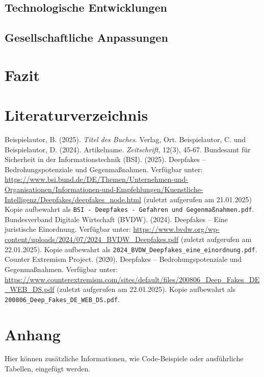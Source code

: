 \documentclass[a4paper,12pt]{article}
\begin{document}
\subsection{Technologische Entwicklungen}
\subsection{Gesellschaftliche Anpassungen}
\newpage

\section{Fazit}



\newpage
{}
\section*{Literaturverzeichnis}
\begin{thebibliography}{99}
     Beispielautor, B. (2025). 
    \textit{Titel des Buches}. Verlag, Ort.
     Beispielautor, C. und Beispielautor, D. (2024). Artikelname. 
    \textit{Zeitschrift}, 12(3), 45-67.
     Bundesamt für Sicherheit in der Informationstechnik (BSI). (2025). Deepfakes – Bedrohungspotenziale und Gegenmaßnahmen. 
    Verfügbar unter: \url{https://www.bsi.bund.de/DE/Themen/Unternehmen-und-Organisationen/Informationen-und-Empfehlungen/Kuenstliche-Intelligenz/Deepfakes/deepfakes_node.html} (zuletzt aufgerufen am 21.01.2025) Kopie aufbewahrt als \texttt{BSI - Deepfakes - Gefahren und Gegenmaßnahmen.pdf}.
     Bundesverband Digitale Wirtschaft (BVDW). (2024). Deepfakes – Eine juristische Einordnung. 
    Verfügbar unter: \url{https://www.bvdw.org/wp-content/uploads/2024/07/2024_BVDW_Deepfakes.pdf} (zuletzt aufgerufen am 22.01.2025). Kopie aufbewahrt als \texttt{2024\_BVDW\_Deepfakes\_eine\_einordnung.pdf}.
     Counter Extremism Project. (2020). Deepfakes – Bedrohungspotenziale und Gegenmaßnahmen.
    Verfügbar unter: \url{https://www.counterextremism.com/sites/default/files/200806_Deep_Fakes_DE_WEB_DS.pdf} (zuletzt aufgerufen am 22.01.2025). Kopie aufbewahrt als \texttt{200806\_Deep\_Fakes\_DE\_WEB\_DS.pdf}.
\end{thebibliography}

\newpage
\appendix
\section{Anhang}
Hier können zusätzliche Informationen, wie Code-Beispiele oder ausführliche Tabellen, eingefügt werden.
\end{document}
